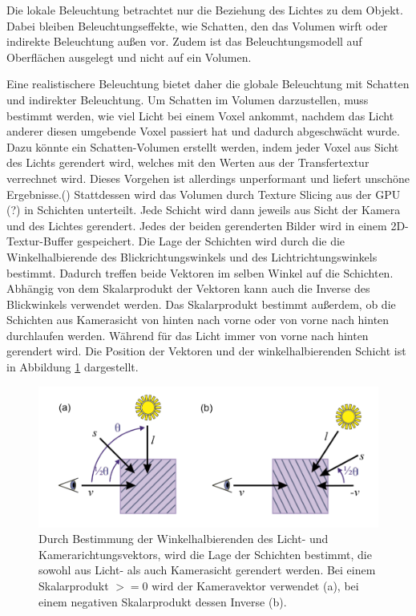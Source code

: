 Die lokale Beleuchtung betrachtet nur die Beziehung des Lichtes zu dem Objekt. Dabei bleiben Beleuchtungseffekte, wie Schatten, den das Volumen wirft oder indirekte Beleuchtung außen vor. Zudem ist das Beleuchtungsmodell auf Oberflächen ausgelegt und nicht auf ein Volumen. 

Eine realistischere Beleuchtung bietet daher die globale Beleuchtung mit Schatten und indirekter Beleuchtung.
Um Schatten im Volumen darzustellen, muss bestimmt werden, wie viel Licht bei einem Voxel ankommt, nachdem das Licht anderer diesen umgebende Voxel passiert hat und dadurch abgeschwächt wurde. 
Dazu könnte ein Schatten-Volumen erstellt werden, indem jeder Voxel aus Sicht des Lichts gerendert wird, welches mit den Werten aus der Transfertextur verrechnet wird. Dieses Vorgehen ist allerdings unperformant und liefert unschöne Ergebnisse.(\citet{Fernando04})
Stattdessen wird das Volumen durch Texture Slicing aus der GPU (?) in Schichten unterteilt. Jede Schicht wird dann jeweils aus Sicht der Kamera und des Lichtes gerendert. Jedes der beiden gerenderten Bilder wird in einem 2D-Textur-Buffer gespeichert. 
Die Lage der Schichten wird durch die die Winkelhalbierende des Blickrichtungswinkels und des Lichtrichtungswinkels bestimmt. Dadurch treffen beide Vektoren im selben Winkel auf die Schichten. Abhängig von dem Skalarprodukt der Vektoren kann auch die Inverse des Blickwinkels verwendet werden. Das Skalarprodukt bestimmt außerdem, ob die Schichten aus Kamerasicht von hinten nach vorne oder von vorne nach hinten durchlaufen werden. Während für das Licht immer von vorne nach hinten gerendert wird.
Die Position der Vektoren und der winkelhalbierenden Schicht ist in Abbildung \ref{img:halfAngleSlice} dargestellt.

\begin{figure}
	\centering
	\includegraphics[width=0.7\linewidth]{images/halfAngleSlice.png}
	\caption{Durch Bestimmung der Winkelhalbierenden des Licht- und Kamerarichtungsvektors, wird die Lage der Schichten bestimmt, die sowohl aus Licht- als auch Kamerasicht gerendert werden. Bei einem Skalarprodukt $>=0$ wird der Kameravektor verwendet (a), bei einem negativen Skalarprodukt dessen Inverse (b). \citet{Hadwiger06}}
	\label{img:halfAngleSlice}
\end{figure}


